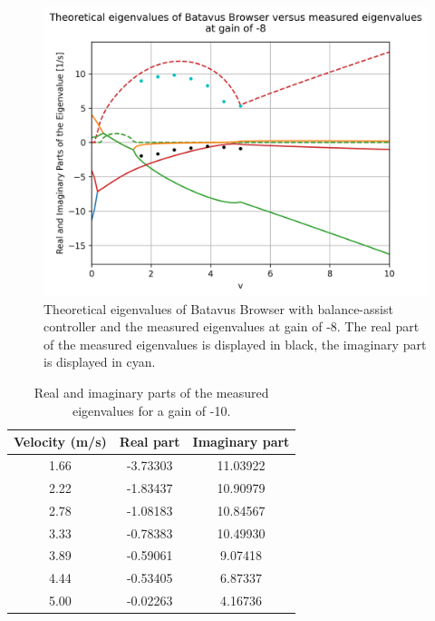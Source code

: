 \documentclass[12pt]{article}
\begin{document}
\begin{figure}
    \centering
    \includegraphics[width=\columnwidth]{figures/gain-8-batavus-without-rider.png}
    \caption{Theoretical eigenvalues of Batavus Browser with balance-assist controller and the measured eigenvalues at gain of -8. The real part of the measured eigenvalues is displayed in black, the imaginary part is displayed  in cyan.}
    \label{gain-8-batavus-without-rider}
\end{figure}


\begin{table}[]
    \centering
    \caption{Real and imaginary parts of the measured eigenvalues for a gain of -10.}
    \label{table-eigenvalues-gain-10}
    \begin{tabular}{c|c|c}
        \textbf{Velocity (m/s)} & \textbf{Real part} & \textbf{Imaginary part} \\ \hline
        1.66                    & -3.73303          & 11.03922                 \\
        2.22                    & -1.83437          & 10.90979                 \\
        2.78                    & -1.08183          & 10.84567                 \\
        3.33                    & -0.78383          & 10.49930                 \\
        3.89                    & -0.59061          & 9.07418                 \\
        4.44                    & -0.53405          & 6.87337                 \\
        5.00                    & -0.02263          & 4.16736                
    \end{tabular}
\end{table}
\end{document}
